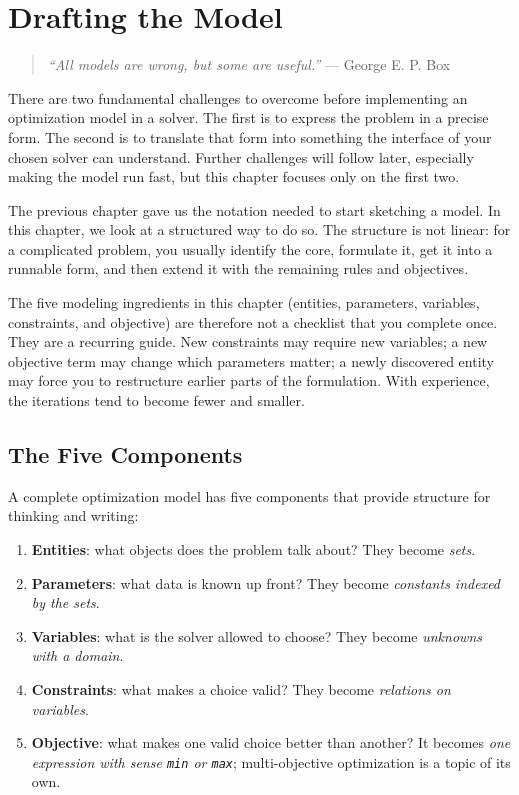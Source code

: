 \chapter{Drafting the Model}\label{chap:3}

\begin{quote}
\emph{``All models are wrong, but some are useful.''} --- George E. P.
Box
\end{quote}

There are two fundamental challenges to overcome before implementing an
optimization model in a solver. The first is to express the problem in a
precise form. The second is to translate that form into something the
interface of your chosen solver can understand. Further challenges will
follow later, especially making the model run fast, but this chapter
focuses only on the first two.

The previous chapter gave us the notation needed to start sketching a
model. In this chapter, we look at a structured way to do so. The
structure is not linear: for a complicated problem, you usually identify
the core, formulate it, get it into a runnable form, and then extend it
with the remaining rules and objectives.

The five modeling ingredients in this chapter (entities, parameters,
variables, constraints, and objective) are therefore not a checklist
that you complete once. They are a recurring guide. New constraints may
require new variables; a new objective term may change which parameters
matter; a newly discovered entity may force you to restructure earlier
parts of the formulation. With experience, the iterations tend to become
fewer and smaller.

\section{The Five Components}\label{sec:3.1}

A complete optimization model has five components that provide structure
for thinking and writing:

\begin{enumerate}
\item
  \textbf{Entities}: what objects does the problem talk about? They
  become \emph{sets}.
\item
  \textbf{Parameters}: what data is known up front? They become
  \emph{constants indexed by the sets}.
\item
  \textbf{Variables}: what is the solver allowed to choose? They
  become \emph{unknowns with a domain}.
\item
  \textbf{Constraints}: what makes a choice valid? They become
  \emph{relations on variables}.
\item
  \textbf{Objective}: what makes one valid choice better than
  another? It becomes \emph{one expression with sense
  \lstinline!min! or \lstinline!max!};
  multi-objective optimization is a topic of its own.
\end{enumerate}


